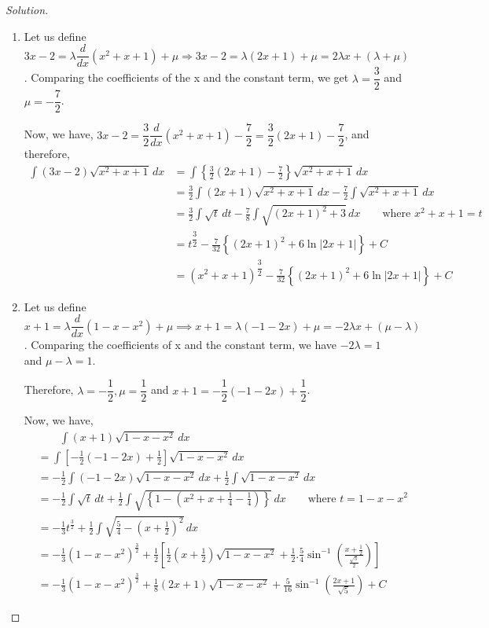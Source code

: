 \documentclass{book}
\theoremstyle{definition}
\newenvironment{solution}
    {\begin{proof}[Solution]}
    {\end{proof}}
\begin{document}
\begin{solution}
\begin{enumerate}[label=(\roman*)]

\item Let us define $3x-2=\lambda \dfrac{d}{dx}(x^2+x+1)+\mu \Rightarrow 3x-2=\lambda (2x+1)+\mu = 2\lambda x+(\lambda+\mu)$. Comparing the coefficients of the x and the constant term, we get $\lambda=\dfrac{3}{2}$ and $\mu=-\dfrac{7}{2}$.

Now, we have, $3x-2 = \dfrac{3}{2}\dfrac{d}{dx}(x^2+x+1)-\dfrac{7}{2} = \dfrac{3}{2}(2x+1)-\dfrac{7}{2}$, and therefore,
\begin{align*}
    \int (3x-2)\sqrt{x^2+x+1}\,dx &= \int \left\{\frac{3}{2}(2x+1)-\frac{7}{2}\right\}\sqrt{x^2+x+1}\,dx \\
    &= \frac{3}{2}\int (2x+1)\sqrt{x^2+x+1}\,dx-\frac{7}{2}\int \sqrt{x^2+x+1}\,dx \\ 
    &= \frac{3}{2}\int \sqrt{t}\,dt-\frac{7}{8}\int \sqrt{(2x+1)^2+3}\,dx \qquad \text{where $x^2+x+1=t$} \\ 
    &= t^{\dfrac{3}{2}}-\frac{7}{32}\left\{(2x+1)^2+6\ln|2x+1|\right\}+C \\ 
    &= (x^2+x+1)^{\dfrac{3}{2}}-\frac{7}{32}\left\{(2x+1)^2+6\ln|2x+1|\right\}+C
\end{align*}


\item Let us define $x+1=\lambda \dfrac{d}{dx}(1-x-x^2)+\mu \implies x+1=\lambda (-1-2x)+\mu = -2\lambda x+(\mu-\lambda)$. \newline
Comparing the coefficients of x and the constant term, we have $-2\lambda=1$ and $\mu-\lambda=1$. 

Therefore, $\lambda=-\dfrac{1}{2}, \mu=\dfrac{1}{2}$ and $x+1=-\dfrac{1}{2}(-1-2x)+\dfrac{1}{2}$.

Now, we have,
\begin{align*}
&\qquad \int (x+1)\sqrt{1-x-x^2}\,dx \\
&= \int \left[-\frac{1}{2}(-1-2x)+\frac{1}{2}\right]\sqrt{1-x-x^2}\,dx \\
&= -\frac{1}{2}\int (-1-2x)\sqrt{1-x-x^2}\,dx+\frac{1}{2}\int\sqrt{1-x-x^2}\,dx  \\ 
&= -\frac{1}{2}\int\sqrt{t}\,dt+\frac{1}{2}\int\sqrt{\left\{1-\left(x^2+x+\frac{1}{4}-\frac{1}{4}\right)\right\}}\,dx \qquad \text{where $t=1-x-x^2$ } \\ 
&= -\frac{1}{3}t^{\frac{3}{2}}+\frac{1}{2}\int\sqrt{\frac{5}{4}-\left(x+\frac{1}{2}\right)^2}\,dx \\ 
&= -\frac{1}{3}(1-x-x^2)^{\frac{3}{2}}+\frac{1}{2}\left[\frac{1}{2}\left(x+\frac{1}{2}\right)\sqrt{1-x-x^2}+\frac{1}{2}.\frac{5}{4}\sin^{-1}\left(\frac{x+\frac{1}{2}}{\frac{\sqrt{5}}{2}}\right)\right] \\ 
&= -\frac{1}{3}(1-x-x^2)^{\frac{3}{2}}+\frac{1}{8}(2x+1)\sqrt{1-x-x^2}+\frac{5}{16}\sin^{-1}\left(\frac{2x+1}{\sqrt{5}}\right)+C
\end{align*}

\end{enumerate} 
\end{solution}
\pagebreak
\end{document}
